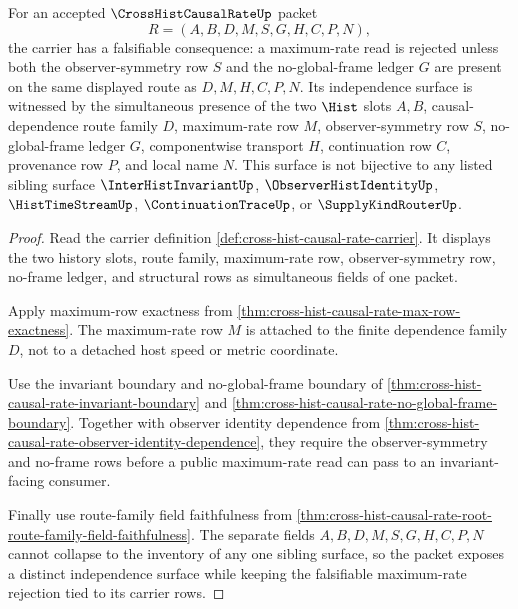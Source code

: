 \begin{theorem}
\label{thm:cross-hist-causal-rate-falsifiability-independence-surface}
For an accepted $\CrossHistCausalRateUp$ packet
$$
R=(A,B,D,M,S,G,H,C,P,N),
$$
the carrier has a falsifiable consequence: a maximum-rate read is rejected unless both the observer-symmetry row $S$ and the no-global-frame ledger $G$ are present on the same displayed route as $D,M,H,C,P,N$. Its independence surface is witnessed by the simultaneous presence of the two $\Hist$ slots $A,B$, causal-dependence route family $D$, maximum-rate row $M$, observer-symmetry row $S$, no-global-frame ledger $G$, componentwise transport $H$, continuation row $C$, provenance row $P$, and local name $N$. This surface is not bijective to any listed sibling surface $\InterHistInvariantUp$, $\ObserverHistIdentityUp$, $\HistTimeStreamUp$, $\ContinuationTraceUp$, or $\SupplyKindRouterUp$.
\end{theorem}
\begin{proof}
Read the carrier definition \autoref{def:cross-hist-causal-rate-carrier}. It displays the two history slots, route family, maximum-rate row, observer-symmetry row, no-frame ledger, and structural rows as simultaneous fields of one packet.

Apply maximum-row exactness from \autoref{thm:cross-hist-causal-rate-max-row-exactness}. The maximum-rate row $M$ is attached to the finite dependence family $D$, not to a detached host speed or metric coordinate.

Use the invariant boundary and no-global-frame boundary of \autoref{thm:cross-hist-causal-rate-invariant-boundary} and \autoref{thm:cross-hist-causal-rate-no-global-frame-boundary}. Together with observer identity dependence from \autoref{thm:cross-hist-causal-rate-observer-identity-dependence}, they require the observer-symmetry and no-frame rows before a public maximum-rate read can pass to an invariant-facing consumer.

Finally use route-family field faithfulness from \autoref{thm:cross-hist-causal-rate-root-route-family-field-faithfulness}. The separate fields $A,B,D,M,S,G,H,C,P,N$ cannot collapse to the inventory of any one sibling surface, so the packet exposes a distinct independence surface while keeping the falsifiable maximum-rate rejection tied to its carrier rows.
\end{proof}


